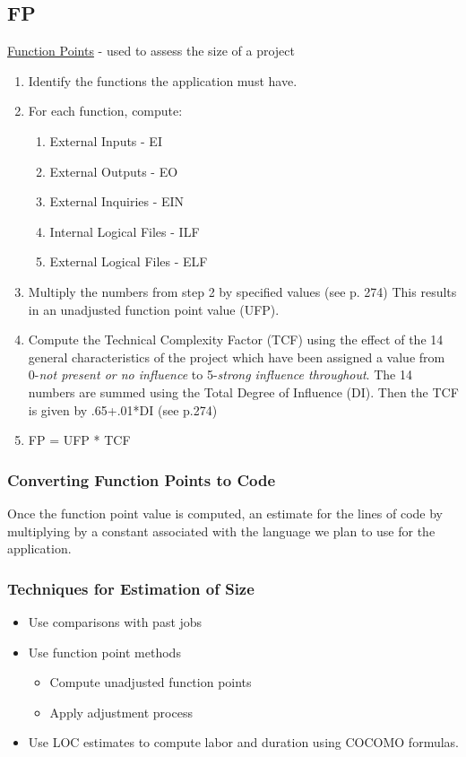 \documentclass{report}
\begin{document}
			\subsection{FP}
				\underline{Function Points} - used to assess the size of a project
				\begin{enumerate}
					\item Identify the functions the application must have.
					\item For each function, compute:
						\begin{enumerate}
							\item External Inputs - EI
							\item External Outputs - EO
							\item External Inquiries - EIN
							\item Internal Logical Files - ILF
							\item External Logical Files - ELF
						\end{enumerate}
					\item Multiply the numbers from step 2 by specified values (see p. 274) This results in an unadjusted function point value (UFP).
					\item Compute the Technical Complexity Factor (TCF) using the effect of the 14 general characteristics of the project which have been assigned a value from 0-\textit{not present or no influence} to 5-\textit{strong influence throughout}. The 14 numbers are summed using the Total Degree of Influence (DI). Then the TCF is given by .65+.01*DI (see p.274)
					\item FP = UFP * TCF
				\end{enumerate}
				\subsubsection{Converting Function Points to Code}
					Once the function point value is computed, an estimate for the lines of code by multiplying by a constant associated with the language we plan to use for the application.
				\subsubsection{Techniques for Estimation of Size}
					\begin{itemize}
						\item Use comparisons with past jobs
						\item Use function point methods
							\begin{itemize}
								\item Compute unadjusted function points
								\item Apply adjustment process
							\end{itemize}
						\item Use LOC estimates to compute labor and duration using COCOMO formulas.
						\end{itemize}
\end{document}
